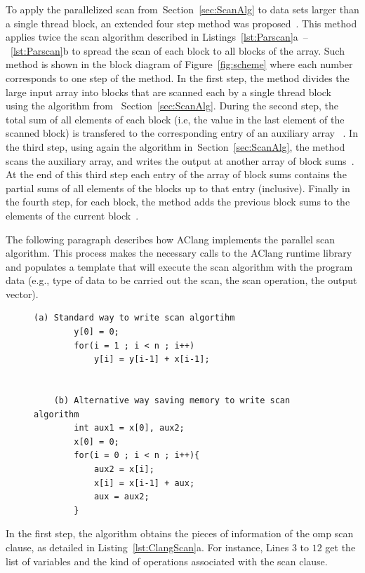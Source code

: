 \documentclass[Ingles]{ic-tese-v1}
\newcommand{\rsec}[1]{Section~\ref{sec:#1}}
\newcommand{\rfig}[1]{Figure~\ref{fig:#1}}
\newcommand{\rlst}[1]{Listing~\ref{lst:#1}}
\newcommand{\rlstn}[3]{Listings~\ref{lst:#1}{#2}~--~\ref{lst:#1}{#3}}
\begin{document}
To apply the  parallelized scan from~\rsec{ScanAlg} to data sets
larger than  a single thread block,  an extended four step  method was
proposed~\cite{harris2007parallel}. This method applies twice the  scan
algorithm described in \rlstn{Parscan}{a}{b} to spread the scan of each
block to all blocks  of the array.  Such method is  shown in the block
diagram of \rfig{scheme} where each  number corresponds to one step of
the method.   In the first  step, the  method divides the  large input
array  into  blocks  that  are   scanned  each  by  a  single  thread
block~ using  the algorithm  from ~\rsec{ScanAlg}.   During the
second step,  the total sum  of all elements  of each block  (i.e, the
value in the  last element of the scanned block)  is transfered to the
corresponding entry of  an auxiliary array ~.   In the third
step, using again  the algorithm in~\rsec{ScanAlg}, the  method scans the
auxiliary  array, and  writes the  output  at another  array of  block
sums~.  At  the end  of this  third step  each entry  of the
array of block  sums contains the partial sums of  all elements of the
blocks up to that entry (inclusive).   Finally in the fourth step,
for each block, the method adds the previous block sums  to the elements of the current
block~.

The following paragraph describes how AClang implements the parallel scan
algorithm. This process makes the necessary calls to the AClang runtime library
and populates a template that will execute the scan algorithm with the program
data (e.g., type of data to be carried out the scan, the scan operation, the
output vector).

\begin{figure}[t]
	\lstset{basicstyle=\scriptsize}
	\begin{lstlisting}[label=lst:ScanKind, caption={Pseudocode of Scan Parallel implementation in AClang}, escapeinside={}]
	(a) Standard way to write scan algortihm
		y[0] = 0;
		for(i = 1 ; i < n ; i++)
			y[i] = y[i-1] + x[i-1];


	(b) Alternative way saving memory to write scan algorithm
		int aux1 = x[0], aux2;
		x[0] = 0;
		for(i = 0 ; i < n ; i++){
			aux2 = x[i];
			x[i] = x[i-1] + aux;
			aux = aux2;
		}

	\end{lstlisting}
\end{figure}

In the first step, the algorithm obtains the pieces of information of the omp
scan clause, as detailed in \rlst{ClangScan}{a}. For
instance, Lines $3$ to $12$ get the list of variables and the kind of operations
associated with the scan clause.
\end{document}
